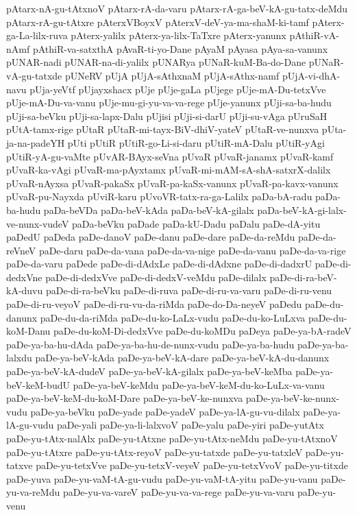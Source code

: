 {pAtarx-nA-gu-tAtxnoV
pAtarx-rA-da-varu
pAtarx-rA-ga-beV-kA-gu-tatx-deMdu
pAtarx-rA-gu-tAtxre
pAterxVBoyxV
pAterxV-deV-ya-ma-shaM-ki-tamf
pAterx-ga-La-lilx-ruva
pAterx-yalilx
pAterx-ya-lilx-TaTxre
pAterx-yanunx
pAthiR-vA-nAmf
pAthiR-va-satxthA
pAvaR-ti-yo-Dane
pAyaM
pAyasa
pAya-sa-vanunx
pUNAR-nadi
pUNAR-na-di-yalilx
pUNARya
pUNaR-kuM-Ba-do-Dane
pUNaR-vA-gu-tatxde
pUNeRV
pUjA
pUjA-sAthxnaM
pUjA-sAthx-namf
pUjA-vi-dhA-navu
pUja-yeVtf
pUjayxshacx
pUje
pUje-gaLa
pUjege
pUje-mA-Du-tetxVve
pUje-mA-Du-va-vanu
pUje-mu-gi-yu-va-va-rege
pUje-yanunx
pUji-sa-ba-hudu
pUji-sa-beVku
pUji-sa-lapx-Dalu
pUjisi
pUji-si-darU
pUji-su-vAga
pUruSaH
pUtA-tamx-rige
pUtaR
pUtaR-mi-tayx-BiV-dhiV-yateV
pUtaR-ve-nunxva
pUta-ja-na-padeYH
pUti
pUtiR
pUtiR-go-Li-si-daru
pUtiR-mA-Dalu
pUtiR-yAgi
pUtiR-yA-gu-vaMte
pUvAR-BAyx-seVna
pUvaR
pUvaR-janamx
pUvaR-kamf
pUvaR-ka-vAgi
pUvaR-ma-pAyxtamx
pUvaR-mi-mAM-sA-shA-satxrX-dalilx
pUvaR-nAyxsa
pUvaR-pakaSx
pUvaR-pa-kaSx-vanunx
pUvaR-pa-kavx-vanunx
pUvaR-pu-Nayxda
pUviR-karu
pUvoVR-tatx-ra-ga-Lalilx
paDa-bA-radu
paDa-ba-hudu
paDa-beVDa
paDa-beV-kAda
paDa-beV-kA-gilalx
paDa-beV-kA-gi-lalx-ve-nunx-vudeV
paDa-beVku
paDade
paDa-kU-Dadu
paDalu
paDe-dA-yitu
paDedU
paDeda
paDe-danoV
paDe-danu
paDe-dare
paDe-da-reMdu
paDe-da-reVneV
paDe-daru
paDe-da-vana
paDe-da-va-nige
paDe-da-vanu
paDe-da-va-rige
paDe-da-varu
paDede
paDe-di-dAdxLe
paDe-di-dAdxne
paDe-di-dadxrU
paDe-di-dedxVne
paDe-di-dedxVve
paDe-di-dedxV-veMdu
paDe-dilalx
paDe-di-ra-beV-kA-duvu
paDe-di-ra-beVku
paDe-di-ruva
paDe-di-ru-va-varu
paDe-di-ru-venu
paDe-di-ru-veyoV
paDe-di-ru-vu-da-riMda
paDe-do-Da-neyeV
paDedu
paDe-du-danunx
paDe-du-da-riMda
paDe-du-ko-LaLx-vudu
paDe-du-ko-LuLxva
paDe-du-koM-Danu
paDe-du-koM-Di-dedxVve
paDe-du-koMDu
paDeya
paDe-ya-bA-radeV
paDe-ya-ba-hu-dAda
paDe-ya-ba-hu-de-nunx-vudu
paDe-ya-ba-hudu
paDe-ya-ba-lalxdu
paDe-ya-beV-kAda
paDe-ya-beV-kA-dare
paDe-ya-beV-kA-du-danunx
paDe-ya-beV-kA-dudeV
paDe-ya-beV-kA-gilalx
paDe-ya-beV-keMba
paDe-ya-beV-keM-budU
paDe-ya-beV-keMdu
paDe-ya-beV-keM-du-ko-LuLx-va-vanu
paDe-ya-beV-keM-du-koM-Dare
paDe-ya-beV-ke-nunxva
paDe-ya-beV-ke-nunx-vudu
paDe-ya-beVku
paDe-yade
paDe-yadeV
paDe-ya-lA-gu-vu-dilalx
paDe-ya-lA-gu-vudu
paDe-yali
paDe-ya-li-lalxvoV
paDe-yalu
paDe-yiri
paDe-yutAtx
paDe-yu-tAtx-nalAlx
paDe-yu-tAtxne
paDe-yu-tAtx-neMdu
paDe-yu-tAtxnoV
paDe-yu-tAtxre
paDe-yu-tAtx-reyoV
paDe-yu-tatxde
paDe-yu-tatxleV
paDe-yu-tatxve
paDe-yu-tetxVve
paDe-yu-tetxV-veyeV
paDe-yu-tetxVvoV
paDe-yu-titxde
paDe-yuva
paDe-yu-vaM-tA-gu-vudu
paDe-yu-vaM-tA-yitu
paDe-yu-vanu
paDe-yu-va-reMdu
paDe-yu-va-vareV
paDe-yu-va-va-rege
paDe-yu-va-varu
paDe-yu-venu
}
